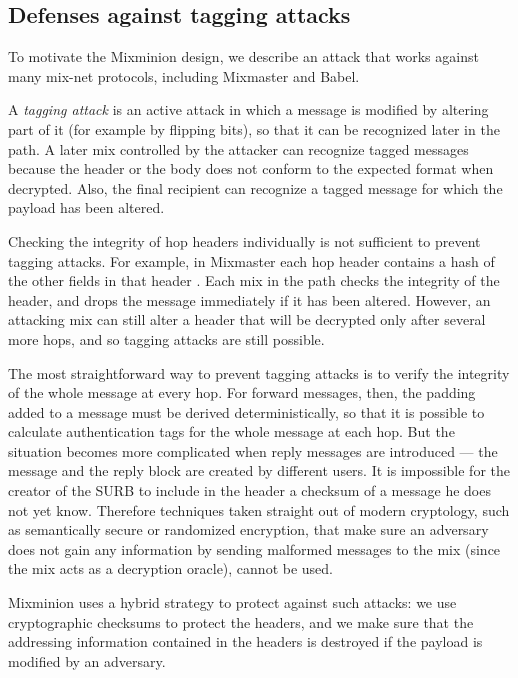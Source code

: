 \documentclass[11pt]{IEEEtran}
\begin{document}
\subsection{Defenses against tagging attacks}
\label{subsec:tagging-attacks}
\label{subsec:tagging-defenses}

To motivate the Mixminion design, we describe an attack
that works against many mix-net protocols, including Mixmaster and Babel.

A {\em tagging attack} is an active attack in which a message is
modified by altering part of it (for example by flipping bits), so
that it can be recognized later in the path.  A later mix controlled by
the attacker can recognize tagged messages because the header or the
body does
not conform to the expected format when decrypted.  Also, the final
recipient can recognize a tagged message for which the payload has
been altered.

Checking the integrity of hop headers individually is not
sufficient to prevent tagging attacks.  For example, in Mixmaster
each hop header contains a hash of the other fields in that header
\cite{mixmaster-spec}.
Each mix in the path checks the integrity of the header, and drops
the message immediately if it has been altered.  However, 
an attacking mix can still alter a header that will be decrypted
only after several more hops, and so tagging attacks are still possible.

The most straightforward way to prevent tagging attacks is to
verify the integrity of the whole message at every hop.  For forward messages,
then, the padding added to a message must be derived deterministically,
so that it is possible to calculate
authentication tags for the whole message at each hop.  But
the situation becomes more complicated when reply messages are
introduced --- the message and the reply block are
created by different users. It is impossible for the creator
of the SURB to include in the header a checksum of a message he
does not yet know. Therefore techniques taken straight out of modern
cryptology, such as semantically secure or randomized encryption, that
make sure an adversary does not gain any information by sending
malformed messages to the mix (since the mix acts as a decryption oracle),
cannot be used.

Mixminion uses a hybrid strategy to protect against
such attacks: we use cryptographic checksums to protect the headers,
and we make sure that the addressing information contained in the
headers is destroyed if the payload is modified by an adversary.
\end{document}
